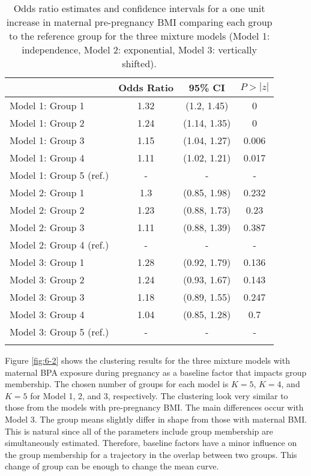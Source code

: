 \begin{table}[ht]
\centering
\begin{tabular}{lccc}
  \thickhline
 & Odds Ratio & 95\% CI& $P>|z|$ \\ 
  \hline
Model 1: Group  1 & 1.32 & (1.2, 1.45) & 0 \\ 
  Model 1: Group  2 & 1.24 & (1.14, 1.35) & 0 \\ 
  Model 1: Group  3 & 1.15 & (1.04, 1.27) & 0.006 \\ 
  Model 1: Group  4 & 1.11 & (1.02, 1.21) & 0.017 \\ 
  Model 1: Group  5  (ref.) & - & - & - \\ 
  Model 2: Group  1 & 1.3 & (0.85, 1.98) & 0.232 \\ 
  Model 2: Group  2 & 1.23 & (0.88, 1.73) & 0.23 \\ 
  Model 2: Group  3 & 1.11 & (0.88, 1.39) & 0.387 \\ 
  Model 2: Group  4  (ref.) & - & - & - \\ 
  Model 3: Group  1 & 1.28 & (0.92, 1.79) & 0.136 \\ 
  Model 3: Group  2 & 1.24 & (0.93, 1.67) & 0.143 \\ 
  Model 3: Group  3 & 1.18 & (0.89, 1.55) & 0.247 \\ 
  Model 3: Group  4 & 1.04 & (0.85, 1.28) & 0.7 \\ 
  Model 3: Group  5  (ref.) & - & - & - \\ 
   \thickhline
\end{tabular}
\caption{Odds ratio estimates and confidence intervals for a one unit increase in maternal pre-pregnancy BMI comparing each group to the reference group for the three mixture models (Model 1: independence, Model 2: exponential, Model 3: vertically shifted). }
\label{tab:6-1}
\end{table}

Figure \ref{fig:6-2} shows the clustering results for the three mixture models with maternal BPA exposure during pregnancy as a baseline factor that impacts group membership. The chosen number of groups for each model is $K = 5$, $K=4$, and $K=5$ for Model 1, 2, and 3, respectively. The clustering look very similar to those from the models with pre-pregnancy BMI. The main differences occur with Model 3. The group means slightly differ in shape from those with maternal BMI. This is natural since all of the parameters include group membership are simultaneously estimated. Therefore, baseline factors have a minor influence on the group membership for a trajectory in the overlap between two groups. This change of group can be enough to change the mean curve.

